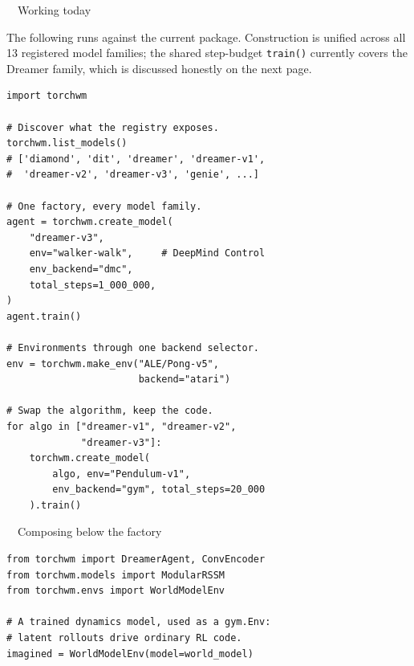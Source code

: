 \documentclass[10pt,a4paper]{article}
\newcommand{\subhead}[1]{{\displayfont\color{ink} #1}\par\vspace{1mm}}
\newcommand{\badge}[3]{\tcbox[on line,boxsep=0pt,left=3pt,right=3pt,top=1.4pt,bottom=1.4pt,
  boxrule=0pt,arc=2pt,colback=#1,coltext=#2]{\scriptsize\displayfont\MakeUppercase{#3}}}
\newcommand{\bimpl}{\badge{greensoft}{green}{implemented}}
\begin{document}
\begin{minipage}[t]{0.485\textwidth}
  \subhead{\bimpl\ \ Working today}
  {\footnotesize The following runs against the current package. Construction is unified across all
  13 registered model families; the shared step-budget \texttt{train()} currently covers the
  Dreamer family, which is discussed honestly on the next page.}
  \vspace{1.5mm}
\begin{lstlisting}
import torchwm

# Discover what the registry exposes.
torchwm.list_models()
# ['diamond', 'dit', 'dreamer', 'dreamer-v1',
#  'dreamer-v2', 'dreamer-v3', 'genie', ...]

# One factory, every model family.
agent = torchwm.create_model(
    "dreamer-v3",
    env="walker-walk",     # DeepMind Control
    env_backend="dmc",
    total_steps=1_000_000,
)
agent.train()

# Environments through one backend selector.
env = torchwm.make_env("ALE/Pong-v5",
                       backend="atari")

# Swap the algorithm, keep the code.
for algo in ["dreamer-v1", "dreamer-v2",
             "dreamer-v3"]:
    torchwm.create_model(
        algo, env="Pendulum-v1",
        env_backend="gym", total_steps=20_000
    ).train()
\end{lstlisting}
  \vspace{1mm}
  {\footnotesize\subhead{\bimpl\ \ Composing below the factory}}
\begin{lstlisting}
from torchwm import DreamerAgent, ConvEncoder
from torchwm.models import ModularRSSM
from torchwm.envs import WorldModelEnv

# A trained dynamics model, used as a gym.Env:
# latent rollouts drive ordinary RL code.
imagined = WorldModelEnv(model=world_model)
\end{lstlisting}
\end{minipage}\hfill
\end{document}
